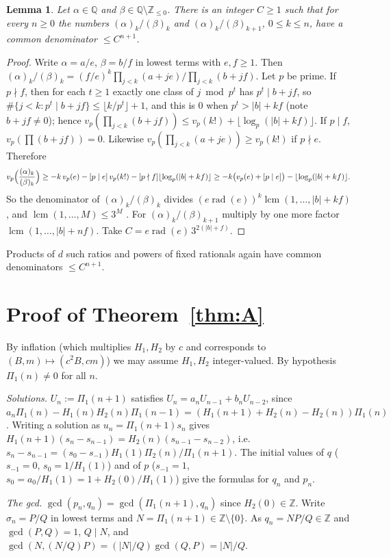 \documentclass[11pt]{amsart}
\newtheorem{lemma}{Lemma}[section]
\theoremstyle{definition}
\theoremstyle{remark}
\numberwithin{equation}{section}
\newcommand{\Q}{\mathbb{Q}}
\newcommand{\Z}{\mathbb{Z}}
\newcommand{\lcm}{\operatorname{lcm}}
\newcommand{\rad}{\operatorname{rad}}
\begin{document}
\begin{lemma}\label{lem:den}
Let $\alpha\in\Q$ and $\beta\in\Q\setminus\Z_{\le0}$. There is an integer $C\ge1$ such that for every $n\ge0$ the numbers $(\alpha)_k/(\beta)_k$ and $(\alpha)_k/(\beta)_{k+1}$, $0\le k\le n$, have a common denominator $\le C^{n+1}$.
\end{lemma}
\begin{proof}
Write $\alpha=a/e$, $\beta=b/f$ in lowest terms with $e,f\ge1$. Then $(\alpha)_k/(\beta)_k=(f/e)^k\prod_{j<k}(a+je)/\prod_{j<k}(b+jf)$. Let $p$ be prime. If $p\nmid f$, then for each $t\ge1$ exactly one class of $j\bmod p^t$ has $p^t\mid b+jf$, so $\#\{j<k:p^t\mid b+jf\}\le\lfloor k/p^t\rfloor+1$, and this is $0$ when $p^t>|b|+kf$ (note $b+jf\neq0$); hence $v_p(\prod_{j<k}(b+jf))\le v_p(k!)+\lfloor\log_p(|b|+kf)\rfloor$. If $p\mid f$, $v_p(\prod(b+jf))=0$. Likewise $v_p(\prod_{j<k}(a+je))\ge v_p(k!)$ if $p\nmid e$. Therefore
\[
v_p\Bigl(\frac{(\alpha)_k}{(\beta)_k}\Bigr)\ge-k\,v_p(e)-[p\mid e]\,v_p(k!)-[p\nmid f]\lfloor\log_p(|b|+kf)\rfloor\ge-k\bigl(v_p(e)+[p\mid e]\bigr)-\lfloor\log_p(|b|+kf)\rfloor .
\]
So the denominator of $(\alpha)_k/(\beta)_k$ divides $(e\rad(e))^k\lcm(1,\dots,|b|+kf)$, and $\lcm(1,\dots,M)\le3^M$ \cite{Han}. For $(\alpha)_k/(\beta)_{k+1}$ multiply by one more factor $\lcm(1,\dots,|b|+nf)$. Take $C=e\rad(e)\,3^{2(|b|+f)}$.
\end{proof}

Products of $d$ such ratios and powers of fixed rationals again have common denominators $\le C^{n+1}$.

\section{Proof of Theorem~\ref{thm:A}}

By inflation (which multiplies $H_1,H_2$ by $c$ and corresponds to $(B,m)\mapsto(c^2B,cm)$) we may assume $H_1,H_2$ integer-valued. By hypothesis $\Pi_1(n)\neq0$ for all $n$.

\emph{Solutions.} $U_n:=\Pi_1(n+1)$ satisfies $U_n=a_nU_{n-1}+b_nU_{n-2}$, since $a_n\Pi_1(n)-H_1(n)H_2(n)\Pi_1(n-1)=(H_1(n+1)+H_2(n)-H_2(n))\Pi_1(n)$. Writing a solution as $u_n=\Pi_1(n+1)s_n$ gives $H_1(n+1)(s_n-s_{n-1})=H_2(n)(s_{n-1}-s_{n-2})$, i.e.\ $s_n-s_{n-1}=(s_0-s_{-1})H_1(1)\Pi_2(n)/\Pi_1(n+1)$. The initial values of $q$ ($s_{-1}=0$, $s_0=1/H_1(1)$) and of $p$ ($s_{-1}=1$, $s_0=a_0/H_1(1)=1+H_2(0)/H_1(1)$) give the formulas for $q_n$ and $p_n$.

\emph{The gcd.} $\gcd(p_n,q_n)=\gcd(\Pi_1(n+1),q_n)$ since $H_2(0)\in\Z$. Write $\sigma_n=P/Q$ in lowest terms and $N=\Pi_1(n+1)\in\Z\setminus\{0\}$. As $q_n=NP/Q\in\Z$ and $\gcd(P,Q)=1$, $Q\mid N$, and $\gcd(N,(N/Q)P)=(|N|/Q)\gcd(Q,P)=|N|/Q$.
\end{document}
